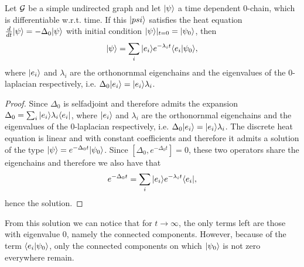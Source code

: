 \documentclass[../2.tex]{subfiles}
\begin{document}
    \begin{prop}
        {\color{blue}Let $\mathcal{G}$ be a simple undirected graph and let $| \psi \rangle$ a time dependent $0$-chain, which is differentiable w.r.t. time.
        If this $| psi \rangle$ satisfies the heat equation $\frac{d}{dt}| \psi \rangle = -\Delta_0 | \psi \rangle$ with initial condition $| \psi \rangle|_{t = 0} = | \psi_0 \rangle$, then
        \[ | \psi \rangle = \sum_i| e_i \rangle e^{-\lambda_i t}\langle e_i | \psi_0 \rangle, \]
        where $| e_i \rangle$ and $\lambda_i$ are the orthonornmal eigenchains and the eigenvalues of the $0$-laplacian respectively,
        i.e. $\Delta_0| e_i \rangle =| e_i \rangle\lambda_i$.}
    \end{prop}
    \begin{proof}
        Since $\Delta_0$ is selfadjoint and therefore admits the expansion $\Delta_0 = \sum_i | e_i \rangle\lambda_i\langle e_i |$,
        where $| e_i \rangle$ and $\lambda_i$ are the orthonornmal eigenchains and the eigenvalues of the $0$-laplacian respectively,
        i.e. $\Delta_0| e_i \rangle =| e_i \rangle\lambda_i$. The discrete heat equation is linear and with constant coefficients and therefore
        it admits a solution of the type $| \psi \rangle = e^{-\Delta_0 t}| \psi_0 \rangle$.
        Since $[\Delta_0, e^{-\Delta_0 t}] = 0$, these two operators share the eigenchains and therefore we also have that
        \[ e^{-\Delta_0 t} = \sum_i | e_i \rangle e^{-\lambda_i t} \langle e_i |,\]
        hence the solution. \qedhere
    \end{proof}

    From this solution we can notice that for $t \to \infty$, the only terms left are those with eigenvalue $0$, namely the connected components.
    However, because of the term $\langle e_i | \psi_0 \rangle$, only the connected components on which $| \psi_0 \rangle$ is not zero everywhere remain.
\end{document}
